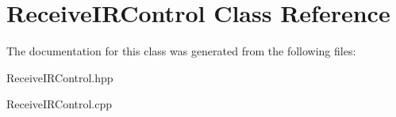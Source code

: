 \hypertarget{class_receive_i_r_control}{}\section{Receive\+I\+R\+Control Class Reference}
\label{class_receive_i_r_control}


The documentation for this class was generated from the following files\+:\begin{DoxyCompactItemize}
\item 
Receive\+I\+R\+Control.\+hpp\item 
Receive\+I\+R\+Control.\+cpp\end{DoxyCompactItemize}
